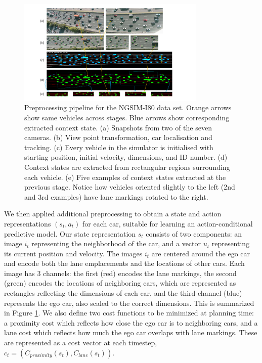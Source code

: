 \documentclass{article} %
\begin{document}
\begin{figure}[t]
  \centering
  \includegraphics[width=0.8\textwidth]{figures/driving/I-80.pdf}
  \caption{
    Preprocessing pipeline for the NGSIM-I80 data set.
    Orange arrows show same vehicles across stages.
    Blue arrows show corresponding extracted context state.
    (a) Snapshots from two of the seven cameras.
    (b) View point transformation, car localisation and tracking.
    (c) Every vehicle in the simulator is initialised with starting position, initial velocity, dimensions, and ID number.
    (d) Context states are extracted from rectangular regions surrounding each vehicle.
    (e) Five examples of context states extracted at the previous stage.
    Notice how vehicles oriented slightly to the left (2nd and 3rd examples) have lane markings rotated to the right.
  }
\label{I-80}
\end{figure}


We then applied additional preprocessing to obtain a state and action representations $(s_t, a_t)$ for each car, suitable for learning an action-conditional predictive model.
Our state representation $s_t$ consists of two components: an image $i_t$ representing the neighborhood of the car, and a vector $u_t$ representing its current position and velocity.
The images $i_t$ are centered around the ego car and encode both the lane emplacements and the locations of other cars.
Each image has 3 channels: the first (red) encodes the lane markings, the second (green) encodes the locations of neighboring cars, which are represented as rectangles reflecting the dimensions of each car, and the third channel (blue) represents the ego car, also scaled to the correct dimensions.
This is summarized in Figure \ref{I-80}.
We also define two cost functions to be minimized at planning time: a proximity cost which reflects how close the ego car is to neighboring cars, and a lane cost which reflects how much the ego car overlaps with lane markings. These are represented as a cost vector at each timestep, $c_t = (C_{proximity}(s_t), C_{lane}(s_t))$.
\end{document}
